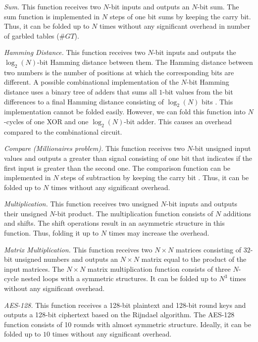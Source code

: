 \textit{Sum.} This function receives two $N$-bit inputs and outputs an $N$-bit sum.
The sum function is implemented in $N$ steps of one bit sums by keeping the carry bit.
Thus, it can be folded up to $N$ times without any significant overhead in number of garbled tables ($\mathit{\#GT}$).

\textit{Hamming Distance.} This function receives two $N$-bit inputs and outputs the $\log_2(N)$-bit Hamming distance between them.
The Hamming distance between two numbers is the number of positions at which the corresponding bits are different.
A possible combinational implementation of the $N$-bit Hamming distance uses a binary tree of adders that sums all $1$-bit values from the bit differences to a final Hamming distance consisting of $\log_2(N)$ bits \cite{boyar2006concrete}.
This implementation cannot be folded easily.
However, we can fold this function into $N$-cycles of one XOR and one $\log_2(N)$-bit adder.
This causes an overhead compared to the combinational circuit.

\textit{Compare (Millionaires problem).} This function receives two $N$-bit unsigned input values and outputs a greater than signal consisting of one bit that indicates if the first input is greater than the second one.
The comparison function can be implemented in $N$ steps of subtraction by keeping the carry bit \cite{kolesnikov2009improved}.
Thus, it can be folded up to $N$ times without any significant overhead.

\textit{Multiplication.} This function receives two unsigned $N$-bit inputs and outputs their unsigned $N$-bit product.
The multiplication function consists of $N$ additions and shifts.
The shift operations result in an asymmetric structure in this function.
Thus, folding it up to $N$ times may increase the overhead.

\textit{Matrix Multiplication.} This function receives two $N\times N$ matrices consisting of $32$-bit unsigned numbers and outputs an $N\times N$ matrix equal to the product of the input matrices.
The $N\times N$ matrix multiplication function consists of three $N$-cycle nested loops with a symmetric structures.
It can be folded up to $N^3$ times without any significant overhead.

\textit{AES-128.} This function receives a 128-bit plaintext and 128-bit round keys and outputs a 128-bit ciphertext based on the Rijndael algorithm.
The AES-128 function consists of 10 rounds with almost symmetric structure.
Ideally, it can be folded up to $10$ times without any significant overhead.

